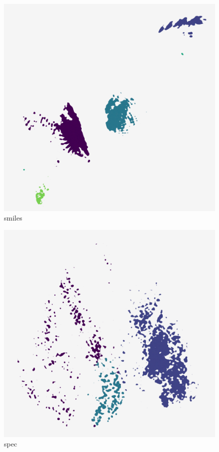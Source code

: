 \begin{subfigure}[b]{.25\linewidth}
    \centering
    \includegraphics[width=\textwidth]{outputs/DRplots/plots/AE_smiles.png}
    \caption{smiles}
    \label{fig:AE_smiles}
\end{subfigure}
\begin{subfigure}[b]{.25\linewidth}
    \centering
    \includegraphics[width=\textwidth]{outputs/DRplots/plots/AE_spec.png}
    \caption{spec}
    \label{fig:AE_spec}
\end{subfigure}